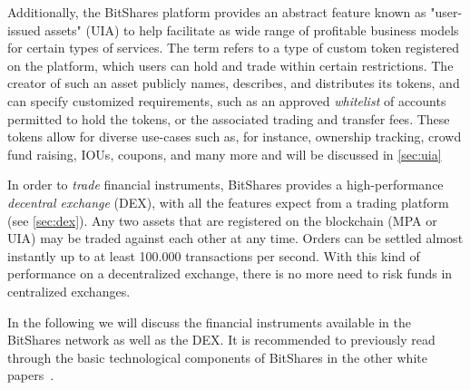 Additionally, the BitShares platform provides an abstract feature known as
"user-issued assets" (UIA) to help facilitate as wide range of profitable
business models for certain types of services. The term refers to a type of
custom token registered on the platform, which users can hold and trade within
certain restrictions. The creator of such an asset publicly names, describes,
and distributes its tokens, and can specify customized requirements, such as an
approved \emph{whitelist} of accounts permitted to hold the tokens, or the
associated trading and transfer fees. These tokens allow for diverse use-cases
such as, for instance, ownership tracking, crowd fund raising, IOUs, coupons,
and many more and will be discussed in \cref{sec:uia}

In order to \emph{trade} financial instruments, BitShares provides a
high-performance \emph{decentral exchange} (DEX), with all the features expect
from a trading platform (see \cref{sec:dex}). Any two assets that are
registered on the blockchain (MPA or UIA) may be traded against each other at
any time. Orders can be settled almost instantly up to at least 100.000
transactions per second.  With this kind of performance on a decentralized
exchange, there is no more need to risk funds in centralized exchanges.


In the following we will discuss the financial instruments available in the
BitShares network as well as the DEX. It is recommended to previously read
through the basic technological components of BitShares in the other white
papers~\cite{bts:general,bts:growth,bts:structure}.
